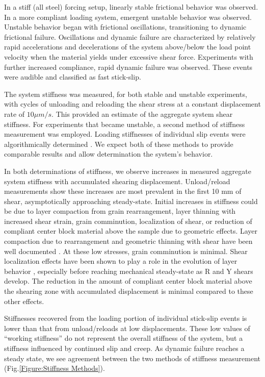 \documentclass[11pt]{article}
\begin{document}
In a stiff (all steel) forcing setup, linearly stable frictional behavior was observed.
In a more compliant loading system, emergent unstable behavior was observed.
Unstable behavior began with frictional oscillations, transitioning to dynamic frictional
failure. Oscillations and dynamic failure are characterized by relatively rapid
accelerations and decelerations of the system above/below the load point
velocity when the material yields under excessive shear force. Experiments with
further increased compliance, rapid dynamic failure was observed. These events
were audible and classified as fast stick-slip.

The system stiffness was measured, for both stable and unstable experiments, with
cycles of unloading and reloading the shear stress at a constant displacement rate of $10 \mu m/s$.  This provided an estimate
of the aggregate system shear stiffness. For experiments that became unstable,
a second method of stiffness measurement was employed. Loading stiffnesses of
individual slip events were algorithmically determined \cite{Leeman:2015}. We expect both
of these methods to provide comparable results and allow determination the system's behavior.

In both determinations of stiffness, we observe increases in measured aggregate
system stiffness with accumulated shearing displacement. Unload/reload measurements show these increases are most
prevalent in the first 10 mm of shear, asymptotically approaching steady-state.
Initial increases in stiffness could be due to layer compaction from
grain rearrangement, layer thinning with increased shear strain, grain
comminution, localization of shear, or reduction of
compliant center block material above the sample due to geometric effects.
Layer compaction due to rearrangement and geometric thinning with shear
have been well documented \cite{Scott:1994}.  At these low stresses, grain
comminution is minimal. Shear localization effects have been shown to play a role in the
evolution of layer behavior \cite{Logan:1992}, especially before reaching mechanical
steady-state as R and Y shears develop. The reduction in the amount of
compliant center block material above the shearing zone with accumulated
displacement is minimal compared to these other effects.

Stiffnesses recovered from the loading portion of individual stick-slip events
is lower than that from unload/reloads at low displacements. These low values
of “working stiffness” do not represent the overall stiffness of the system, but
a stiffness influenced by continued slip and creep. As dynamic failure reaches a
steady state, we see agreement between the two methods of stiffness measurement
(Fig.\ref{Figure:Stiffness Methods}).
\end{document}
